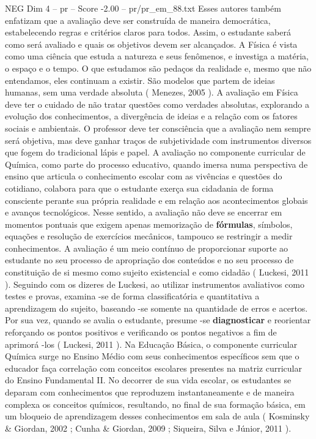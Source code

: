 \begin{textsample}{NEG Dim 4 – pr – Score -2.00 – pr/pr\_em\_88.txt}
Esses autores também enfatizam que a avaliação deve ser construída de maneira democrática, estabelecendo regras e critérios claros para todos.
Assim, o estudante saberá como será avaliado e quais os objetivos devem ser alcançados.
A Física é vista como uma ciência que estuda a natureza e seus fenômenos, e investiga a matéria, o espaço e o tempo.
O que estudamos são pedaços da realidade e, mesmo que não entendamos, eles continuam a existir.
São modelos que partem de ideias humanas, sem uma verdade absoluta ( Menezes, 2005 ).
A avaliação em Física deve ter o cuidado de não tratar questões como verdades absolutas, explorando a evolução dos conhecimentos, a divergência de ideias e a relação com os fatores sociais e ambientais.
O professor deve ter consciência que a avaliação nem sempre será objetiva, mas deve ganhar traços de subjetividade com instrumentos diversos que fogem do tradicional lápis e papel.
A avaliação no componente curricular de Química, como parte do processo educativo, quando imersa numa perspectiva de ensino que articula o conhecimento escolar com as vivências e questões do cotidiano, colabora para que o estudante exerça sua cidadania de forma consciente perante sua própria realidade e em relação aos acontecimentos globais e avanços tecnológicos.
Nesse sentido, a avaliação não deve se encerrar em momentos pontuais que exigem apenas memorização de \textbf{fórmulas}, símbolos, equações e resolução de exercícios mecânicos, tampouco se restringir a medir conhecimentos.
A avaliação é um meio contínuo de proporcionar suporte ao estudante no seu processo de apropriação dos conteúdos e no seu processo de constituição de si mesmo como sujeito existencial e como cidadão ( Luckesi, 2011 ).
Seguindo com os dizeres de Luckesi, ao utilizar instrumentos avaliativos como testes e provas, examina -se de forma classificatória e quantitativa a aprendizagem do sujeito, baseando -se somente na quantidade de erros e acertos.
Por sua vez, quando se avalia o estudante, presume -se \textbf{diagnosticar} e reorientar reforçando os pontos positivos e verificando os pontos negativos a fim de aprimorá -los ( Luckesi, 2011 ).
Na Educação Básica, o componente curricular Química surge no Ensino Médio com seus conhecimentos específicos sem que o educador faça correlação com conceitos escolares presentes na matriz curricular do Ensino Fundamental II.
No decorrer de sua vida escolar, os estudantes se deparam com conhecimentos que reproduzem instantaneamente e de maneira complexa os conceitos químicos, resultando, no final de sua formação básica, em um bloqueio de aprendizagem desses conhecimentos em sala de aula ( Kosminsky \& Giordan, 2002 ; Cunha \& Giordan, 2009 ; Siqueira, Silva e Júnior, 2011 ).

\end{textsample}
